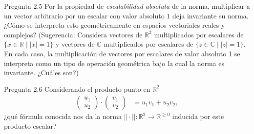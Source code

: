 \documentclass[12pt,dvipsnames]{article}
\numberwithin{equation}{section}
\begin{document}
Pregunta 2.5 Por la propiedad de \emph{escalabilidad absoluta} de la norma, multiplicar a un vector arbitrario por un escalar con valor absoluto $1$ deja invariante su norma. ¿Cómo se interpreta esto geométricamente en espacios vectoriales reales y complejos? (Sugerencia: Considera vectores de $\mathbb{R}^2$ multiplicados por escalares de $\{x\in \mathbb{R} \mid |x| = 1\}$ y vectores de $\mathbb{C}$ multiplicados por escalares de $\{z\in\mathbb{C} \mid |z|=1\}$. En cada caso, la multiplicación de vectores por escalares de valor absoluto 1 se interpreta como un tipo de operación geométrica bajo la cual la norma es invariante. ¿Cuáles son?)

Pregunta 2.6 Considerando el producto punto en $\mathbb{R}^2$
\begin{align*}
    \begin{pmatrix} u_1 \\ u_2 \end{pmatrix} \cdot \begin{pmatrix} v_1 \\ v_2 \end{pmatrix} &= u_1v_1 + u_2v_2,
\end{align*}
¿qué fórmula conocida nos da la norma $||\cdot||:\mathbb{R}^2\to \mathbb{R}^{\ge0}$ inducida por este producto escalar?
\end{document}
